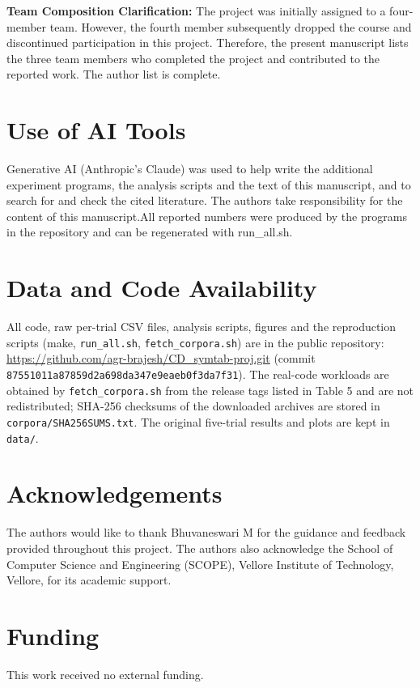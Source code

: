 \documentclass{ieeeaccess}
\begin{document}
\noindent\textbf{Team Composition Clarification:} The project was initially assigned to a four-member team. However, the fourth member subsequently dropped the course and discontinued participation in this project. Therefore, the present manuscript lists the three team members who completed the project and contributed to the reported work. The author list is complete.

\section*{Use of AI Tools}

Generative AI (Anthropic's Claude) was used to help write the additional experiment programs, the analysis scripts and the text of this manuscript, and to search for and check the cited literature. The authors take responsibility for the content of this manuscript.All reported numbers were produced by the programs in the repository and can be regenerated with run\_all.sh.

\section*{Data and Code Availability}
All code, raw per-trial CSV files, analysis scripts, figures and the reproduction scripts (make, \texttt{run\_all.sh}, \texttt{fetch\_corpora.sh}) are in the public repository: \url{https://github.com/agr-brajesh/CD_symtab-proj.git} (commit \texttt{87551011a87859d2a698da347e9eaeb0f3da7f31}). The real-code workloads are obtained by \texttt{fetch\_corpora.sh} from the release tags listed in Table 5 and are not redistributed; SHA-256 checksums of the downloaded archives are stored in \texttt{corpora/SHA256SUMS.txt}. The original five-trial results and plots are kept in \texttt{data/}.

\section*{Acknowledgements}
The authors would like to thank Bhuvaneswari M for the guidance and feedback provided throughout this project. The authors also acknowledge the School of Computer Science and Engineering (SCOPE), Vellore Institute of Technology, Vellore, for its academic support.

\section*{Funding}
This work received no external funding.
\end{document}
